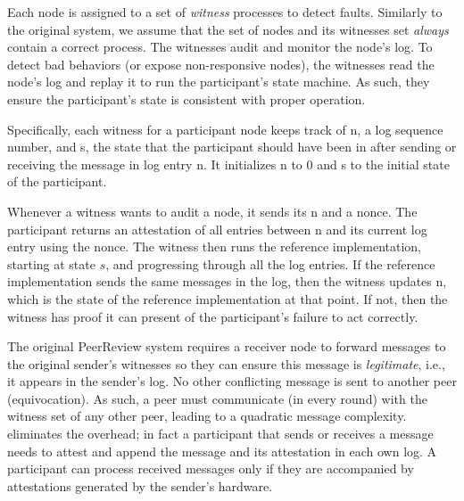 Each node is assigned to a set of {\em witness} processes to detect faults. Similarly to the original system, we assume that the set of nodes and its witnesses set {\em always} contain a correct process. The witnesses audit and monitor the node's log. To detect bad behaviors (or expose non-responsive nodes), the witnesses read the node's log and replay it to run the participant’s state machine. As such, they ensure the participant’s state is consistent with proper operation. 

Specifically, each witness for a participant node keeps track of n, a log sequence number, and s, the state that the participant should have been in after sending or receiving the message in log entry n. It initializes n to 0 and s to the initial state of the participant.

Whenever a witness wants to audit a node, it sends its n and a nonce.
The participant returns an attestation of all entries between n and its current log entry using the nonce. The witness then runs the reference implementation, starting at state $s$, and progressing through all the log entries. If the reference implementation sends the same messages in the log, then the witness updates n, which is the state of the reference implementation at that point. If not, then the witness has proof it can present of the participant’s failure to act correctly.




The original PeerReview system requires a receiver node to forward messages to the original sender’s witnesses so they can ensure this message is {\em legitimate}, i.e., it appears in the sender’s log. No other conflicting message is sent to another peer (equivocation). As such, a peer must communicate (in every round) with the witness set of any other peer, leading to a quadratic message complexity. \projecttitle{} eliminates the overhead; in fact a participant that sends or receives a message needs to attest and append the message and its attestation in each own log. A participant can process received messages only if they are accompanied by attestations generated by the sender's \projecttitle{} hardware. 



\noindent{}


